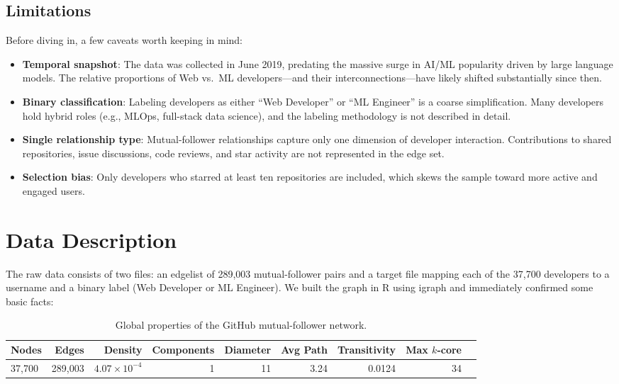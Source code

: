 \documentclass[letterpaper]{article}
\begin{document}
\subsection{Limitations}

Before diving in, a few caveats worth keeping in mind:
\begin{itemize}
  \item \textbf{Temporal snapshot}: The data was collected in June 2019, predating the massive surge in AI/ML popularity driven by large language models. The relative proportions of Web vs.\ ML developers---and their interconnections---have likely shifted substantially since then.
  \item \textbf{Binary classification}: Labeling developers as either ``Web Developer'' or ``ML Engineer'' is a coarse simplification. Many developers hold hybrid roles (e.g., MLOps, full-stack data science), and the labeling methodology is not described in detail.
  \item \textbf{Single relationship type}: Mutual-follower relationships capture only one dimension of developer interaction. Contributions to shared repositories, issue discussions, code reviews, and star activity are not represented in the edge set.
  \item \textbf{Selection bias}: Only developers who starred at least ten repositories are included, which skews the sample toward more active and engaged users.
\end{itemize}

\section{Data Description}

The raw data consists of two files: an edgelist of 289,003 mutual-follower pairs and a target file mapping each of the 37,700 developers to a username and a binary label (Web Developer or ML Engineer). We built the graph in R using igraph and immediately confirmed some basic facts:

\begin{table}[H]
  \centering
  \begin{tabular}{lrrrrrrrr}
    \toprule
    \textbf{Nodes} & \textbf{Edges} & \textbf{Density} & \textbf{Components} & \textbf{Diameter} & \textbf{Avg Path} & \textbf{Transitivity} & \textbf{Max $k$-core} \\
    \midrule
    37,700 & 289,003 & $4.07 \times 10^{-4}$ & 1 & 11 & 3.24 & 0.0124 & 34 \\
    \bottomrule
  \end{tabular}
  \caption{Global properties of the GitHub mutual-follower network.}
  \label{tab:global}
\end{table}
\end{document}
